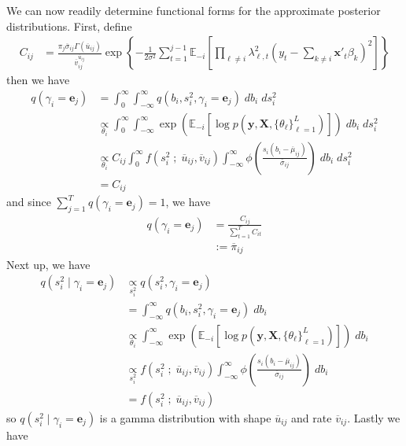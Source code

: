 \documentclass{article}
\newcommand{\E}{\mathbb{E}}
\begin{document}
We can now readily determine functional forms for the approximate posterior distributions. First, define 
\begin{align*}
    C_{ij} &= \frac{\pi_j \overline{\sigma}_{ij} \Gamma(\overline{u}_{ij})}{\overline{v}_{ij}^{\overline{u}_{ij}}} \exp\left\{ - \frac{1}{2\sigma^2} \sum_{t=1}^{j-1} \E_{-i}\left[\prod_{\ell \neq i} \lambda_{\ell,t}^2\left(y_t - \sum_{k\neq i} \mathbf{x}'_t\beta_k\right)^2\right]\right\}
\end{align*}
then we have
\begin{align*}
    q(\gamma_i = \mathbf{e}_j) &= \int_0^\infty \int_{-\infty}^\infty q(b_i, s_i^2, \gamma_i = \mathbf{e}_j) \;d b_i\;ds_i^2 \\
    &\underset{\theta_i}{\propto} \int_0^\infty \int_{-\infty}^\infty \exp\left(\E_{-i}\left[\log p\left(\mathbf{y}, \mathbf{X}, \{\theta_\ell\}_{\ell=1}^L\right)\right]\right)\;d b_i\;ds_i^2 \\
    &\underset{\theta_i}{\propto} C_{ij}\int_0^\infty f(s_i^2 \;;\; \overline{u}_{ij}, \overline{v}_{ij})\int_{-\infty}^\infty 
    \phi\left( \frac{s_i(b_i - \overline{\mu}_{ij})}{\overline{\sigma}_{ij}}\right) \; db_i\;d s_i^2 \\
    &= C_{ij}
\end{align*}
and since $\sum_{j=1}^T q(\gamma_i = \mathbf{e}_j) = 1$, we have
\begin{align*}
    q(\gamma_i = \mathbf{e}_j) &= \frac{C_{ij}}{\sum_{t=1}^T C_{it}} \\
    &:= \overline{\pi}_{ij}
\end{align*}
Next up, we have
\begin{align*}
    q(s_i^2 \;|\; \gamma_i = \mathbf{e}_j) &\underset{s^2_i}{\propto} q(s_i^2, \gamma_i = \mathbf{e}_j) \\
    &= \int_{-\infty}^\infty q(b_i, s_i^2, \gamma_i = \mathbf{e}_j) \;d b_i \\
    &\underset{\theta_i}{\propto} \int_{-\infty}^\infty \exp\left(\E_{-i}\left[\log p\left(\mathbf{y}, \mathbf{X}, \{\theta_\ell\}_{\ell=1}^L\right)\right]\right)\;d b_i \\
    &\underset{s_i^2}{\propto}  f(s_i^2 \;;\; \overline{u}_{ij}, \overline{v}_{ij}) \int_{-\infty}^\infty  \phi\left( \frac{s_i(b_i - \overline{\mu}_{ij})}{\overline{\sigma}_{ij}}\right) \; db_i \\
    &= f(s_i^2 \;;\; \overline{u}_{ij}, \overline{v}_{ij})
\end{align*}
so $q(s_i^2 \;|\; \gamma_i = \mathbf{e}_j)$ is a gamma distribution with shape $\overline{u}_{ij}$ and rate  $\overline{v}_{ij}$. Lastly we have 
\end{document}
